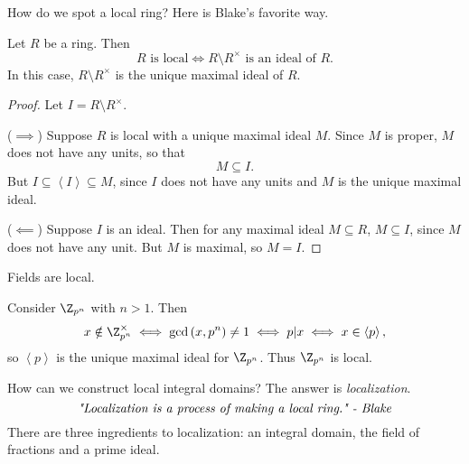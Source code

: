 \documentclass[pmath441]{subfiles}
\begin{document}
    \np How do we spot a local ring? Here is Blake's favorite way.

    \begin{prop}{}
        Let $R$ be a ring. Then
        \begin{equation*}
            R\text{ is local} \iff R\setminus R^{\times} \text{ is an ideal of $R$}.
        \end{equation*}
        In this case, $R\setminus R^{\times}$ is the unique maximal ideal of $R$.
    \end{prop}

    \begin{proof}
        Let $I = R\setminus R^{\times}$.

        ($\implies$) Suppose $R$ is local with a unique maximal ideal $M$. Since $M$ is proper, $M$ does not have any units, so that
        \begin{equation*}
            M \subseteq I.
        \end{equation*}
        But $I \subseteq \left< I \right> \subseteq M$, since $I$ does not have any units and $M$ is the unique maximal ideal. 

        ($\impliedby$) Suppose $I$ is an ideal. Then for any maximal ideal $M\subseteq R$, $M\subseteq I$, since $M$ does not have any unit. But $M$ is maximal, so $M = I$.
    \end{proof}

    \begin{example}{}
        Fields are local.
    \end{example}

    \rruleline

    \begin{example}{}
        Consider $\Z_{p^n}$ with $n>1$. Then
        \begin{equation*}
            x\notin\Z_{p^n}^{\times} \iff \gcd\left( x,p^n \right)\neq 1 \iff p|x \iff x\in\left< p \right>,  
        \end{equation*}
        so $\left< p \right>$ is the unique maximal ideal for $\Z_{p^n}$. Thus $\Z_{p^n}$ is local.
    \end{example}

    \rruleline

    \np How can we construct local integral domains? The answer is \textit{localization}.
    \begin{equation*}
        \text{\textit{"Localization is a process of making a local ring." - Blake}}
    \end{equation*}
    There are three ingredients to localization: an integral domain, the field of fractions and a prime ideal.
\end{document}
